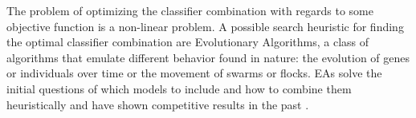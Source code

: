 The problem of optimizing the classifier combination with regards to some objective function is a non-linear problem. A possible search heuristic for finding the optimal classifier combination are Evolutionary Algorithms, a class of algorithms that emulate different behavior found in nature: the evolution of genes or individuals over time or the movement of swarms or flocks. EAs solve the initial questions of which models to include and how to combine them heuristically and have shown competitive results in the past \citep{oliveira2005multi}.




